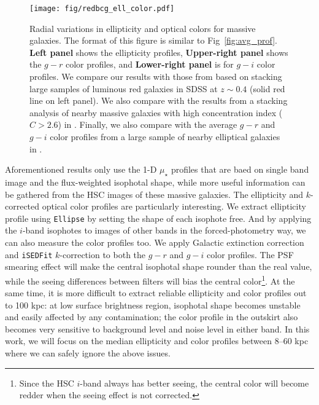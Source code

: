 \documentclass[a4paper,fleqn,usenatbib]{mnras}
\def\mden{{$\mu_{\star}$}}
\begin{document}
  \begin{figure}
      \centering 
      \texttt{[image: fig/redbcg\_ell\_color.pdf]}
      \caption{
          Radial variations in ellipticity and optical colors for massive galaxies. 
          The format of this figure is similar to Fig~\ref{fig:avg_prof}. 
          \textbf{Left panel} shows the ellipticity profiles, 
          \textbf{Upper-right panel} shows the $g-r$ color profiles, and 
          \textbf{Lower-right panel} is for $g-i$ color profiles. 
          We compare our results with those from \citet{Tal2011} based on stacking 
          large samples of luminous red galaxies in SDSS at $z{\sim} 0.4$ 
          (solid red line on left panel). 
          We also compare with the results from a stacking analysis of nearby massive 
          galaxies with high concentration index ($C>2.6$) in 
          \citet[][blue dash lines on the left and upper-right panels]{DSouza2014}. 
          Finally, we also compare with the average $g-r$ and $g-i$ color profiles 
          from a large sample of nearby elliptical galaxies in \citet[][blue, solid 
          lines on both right panels]{LaBarbera2010}.
          }
      \label{fig:ell_color}
  \end{figure}
    
	Aforementioned results only use the 1-D \mden{} profiles that are baed on single 
	band image and the flux-weighted isophotal shape, while more useful information 
	can be gathered from the HSC images of these massive galaxies.
	The ellipticity and $k$-corrected optical color profiles are particularly 
	interesting.
	We extract ellipticity profile using \texttt{Ellipse} by setting the shape of each 
	isophote free. 
	And by applying the $i$-band isophotes to images of other bands in the 
	forced-photometry way, we can also measure the color profiles too. 
	We apply Galactic extinction correction and \texttt{iSEDFit} $k$-correction to 
	both the $g-r$ and $g-i$ color profiles.
	The PSF smearing effect will make the central isophotal shape rounder than the 
	real value, while the seeing differences between filters will bias the central 
	color\footnote{Since the HSC $i$-band always has better seeing, the central color 
	will become redder when the seeing effect is not corrected.}. 
	At the same time, it is more difficult to extract reliable ellipticity and 
	color profiles out to 100 kpc: at low surface brightness region, isophotal shape 
	becomes unstable and easily affected by any contamination; the color profile in
	the outskirt also becomes very sensitive to background level and noise level in 
	either band. 
	In this work, we will focus on the median ellipticity and color profiles between 
	8--60 kpc where we can safely ignore the above issues. 
	
\end{document}
